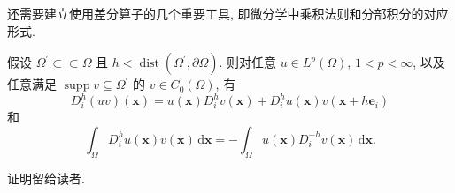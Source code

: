 还需要建立使用差分算子的几个重要工具, 即微分学中乘积法则和分部积分的对应形式.

\begin{Lemma}
\label{lem:difference-quotient-product-and-parts}
假设 $\Omega^{\prime}\subset\subset\Omega$ 且 $h<\operatorname{dist}(\Omega^{\prime},\partial\Omega)$. 则对任意 $u\in L^p(\Omega)$, $1<p<\infty$, 以及任意满足 $\operatorname{supp}v\subseteq\Omega^{\prime}$ 的 $v\in C_0(\Omega)$, 有
\begin{equation}\label{eq:difference-quotient-shifted-product-rule}
D_i^h(uv)(\bm{x})=u(\bm{x})D_i^hv(\bm{x})+D_i^hu(\bm{x})v(\bm{x}+h\bm{e}_i)
\end{equation}
和
\begin{equation}\label{eq:difference-quotient-integration-by-parts}
\int_\Omega D_i^hu(\bm{x})v(\bm{x})\,\mathrm{d}\bm{x}=-\int_\Omega u(\bm{x})D_i^{-h}v(\bm{x})\,\mathrm{d}\bm{x}.
\end{equation}

\end{Lemma}

证明留给读者.

